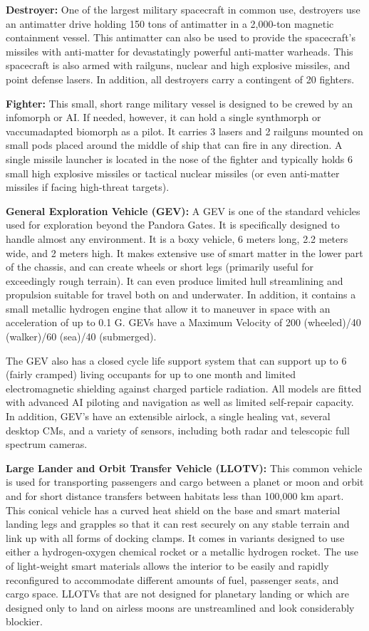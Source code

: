 {{\textbf{Destroyer:} One of the largest military spacecraft in common use, destroyers use an antimatter drive holding 150 tons of antimatter in a 2,000-ton magnetic containment vessel. This antimatter can also be used to provide the spacecraft’s missiles with anti-matter for devastatingly powerful anti-matter warheads. This spacecraft is also armed with railguns, nuclear and high explosive missiles, and point defense lasers. In addition, all destroyers carry a contingent of 20 fighters. 

\textbf{Fighter:} This small, short range military vessel is designed to be crewed by an infomorph or AI. If needed, however, it can hold a single synthmorph or vaccumadapted biomorph as a pilot. It carries 3 lasers and 2 railguns mounted on small pods placed around the middle of ship that can fire in any direction. A single missile launcher is located in the nose of the fighter and typically holds 6 small high explosive missiles or tactical nuclear missiles (or even anti-matter missiles if facing high-threat targets). 

\textbf{General Exploration Vehicle (GEV):} A GEV is one of the standard vehicles used for exploration beyond the Pandora Gates. It is specifically designed to handle almost any environment. It is a boxy vehicle, 6 meters long, 2.2 meters wide, and 2 meters high. It makes extensive use of smart matter in the lower part of the chassis, and can create wheels or short legs (primarily useful for exceedingly rough terrain). It can even produce limited hull streamlining and propulsion suitable for travel both on and underwater. In addition, it contains a small metallic hydrogen engine that allow it to maneuver in space with an acceleration of up to 0.1 G. GEVs have a Maximum Velocity of 200 (wheeled)/40 (walker)/60 (sea)/40 (submerged). 

The GEV also has a closed cycle life support system that can support up to 6 (fairly cramped) living occupants for up to one month and limited electromagnetic shielding against charged particle radiation. All models are fitted with advanced AI piloting and navigation as well as limited self-repair capacity. In addition, GEV’s have an extensible airlock, a single healing vat, several desktop CMs, and a variety of sensors, including both radar and telescopic full spectrum cameras. 

\textbf{Large Lander and Orbit Transfer Vehicle (LLOTV):} This common vehicle is used for transporting passengers and cargo between a planet or moon and orbit and for short distance transfers between habitats less than 100,000 km apart. This conical vehicle has a curved heat shield on the base and smart material landing legs and grapples so that it can rest securely on any stable terrain and link up with all forms of docking clamps. It comes in variants designed to use either a hydrogen-oxygen chemical rocket or a metallic hydrogen rocket. The use of light-weight smart materials allows the interior to be easily and rapidly reconfigured to accommodate different amounts of fuel, passenger seats, and cargo space. LLOTVs that are not designed for planetary landing or which are designed only to land on airless moons are unstreamlined and look considerably blockier. 

}}
